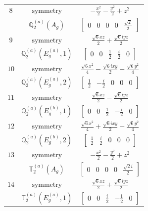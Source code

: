\documentclass[fleqn,8pt,landscape]{jsarticle}
\begin{document}
\begin{longtable}{ccc}
$ 8 $ & $ \text{symmetry} $ & $ - \frac{x^{2}}{2} - \frac{y^{2}}{2} + z^{2} $ \\
$  $ & $ \mathbb{Q}_{2}^{(a)}(A_{g}) $ & $ \begin{bmatrix} 0 & 0 & 0 & 0 & \frac{\sqrt{2}}{2} \end{bmatrix} $ \\ \hline
$ 9 $ & $ \text{symmetry} $ & $ \frac{\sqrt{6} x z}{2} + \frac{\sqrt{6} i y z}{2} $ \\
$  $ & $ \mathbb{Q}_{2}^{(a)}(E_{g}^{(a)},1) $ & $ \begin{bmatrix} 0 & 0 & \frac{1}{2} & \frac{i}{2} & 0 \end{bmatrix} $ \\ \hline
$ 10 $ & $ \text{symmetry} $ & $ \frac{\sqrt{6} x^{2}}{4} - \frac{\sqrt{6} i x y}{2} - \frac{\sqrt{6} y^{2}}{4} $ \\
$  $ & $ \mathbb{Q}_{2}^{(a)}(E_{g}^{(a)},2) $ & $ \begin{bmatrix} \frac{1}{2} & - \frac{i}{2} & 0 & 0 & 0 \end{bmatrix} $ \\ \hline
$ 11 $ & $ \text{symmetry} $ & $ \frac{\sqrt{6} x z}{2} - \frac{\sqrt{6} i y z}{2} $ \\
$  $ & $ \mathbb{Q}_{2}^{(a)}(E_{g}^{(b)},1) $ & $ \begin{bmatrix} 0 & 0 & \frac{1}{2} & - \frac{i}{2} & 0 \end{bmatrix} $ \\ \hline
$ 12 $ & $ \text{symmetry} $ & $ \frac{\sqrt{6} x^{2}}{4} + \frac{\sqrt{6} i x y}{2} - \frac{\sqrt{6} y^{2}}{4} $ \\
$  $ & $ \mathbb{Q}_{2}^{(a)}(E_{g}^{(b)},2) $ & $ \begin{bmatrix} \frac{1}{2} & \frac{i}{2} & 0 & 0 & 0 \end{bmatrix} $ \\ \hline
$ 13 $ & $ \text{symmetry} $ & $ - \frac{x^{2}}{2} - \frac{y^{2}}{2} + z^{2} $ \\
$  $ & $ \mathbb{T}_{2}^{(a)}(A_{g}) $ & $ \begin{bmatrix} 0 & 0 & 0 & 0 & \frac{\sqrt{2} i}{2} \end{bmatrix} $ \\ \hline
$ 14 $ & $ \text{symmetry} $ & $ \frac{\sqrt{6} x z}{2} + \frac{\sqrt{6} i y z}{2} $ \\
$  $ & $ \mathbb{T}_{2}^{(a)}(E_{g}^{(a)},1) $ & $ \begin{bmatrix} 0 & 0 & \frac{i}{2} & - \frac{1}{2} & 0 \end{bmatrix} $ \\ \hline

\end{longtable}
\end{document}
